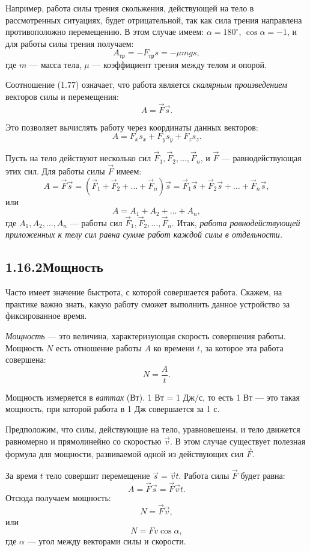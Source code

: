 Например, работа силы трения скольжения, действующей на тело в рассмотренных ситуа\-циях, будет отрицательной, так как сила трения направлена противоположно перемещению. В этом случае имеем: $\alpha=180^{\circ}$, $\cos\alpha=-1$, и для работы силы трения получаем:
\vadjust{\kern-1.007bp}
$$A_{\text{тр}}=-F_{\text{тр}}s=-\mu mgs,$$
\newpage
\noindent где $m$ — масса тела, $\mu$ — коэффициент трения между телом и опорой.

\vspace{5.146bp}
Соотношение (\textcolor{booklink}{1.77}) означает, что работа является \textit{скалярным произведением} векторов силы и перемещения:
$$A=\vec F\vec s.$$

Это позволяет вычислять работу через координаты данных векторов:
$$A=F_xs_x+F_ys_y+F_zs_z.$$

Пусть на тело действуют несколько сил $\vec F_1,\vec F_2,\ldots,\vec F_n$, и $\vec F$ — равнодействующая этих сил. Для работы силы $\vec F$ имеем:
$$A=\vec F\vec s=(\vec F_1+\vec F_2+\ldots+\vec F_n)\vec s=\vec F_1\vec s+\vec F_2\vec s+\ldots+\vec F_n\vec s,$$
\noindent или
$$A=A_1+A_2+\ldots+A_n,$$
\noindent где $A_1,A_2,\ldots,A_n$ — работы сил $\vec F_1,\vec F_2,\ldots,\vec F_n$. Итак, \textit{работа равнодействующей приложенных к телу сил равна сумме работ каждой силы в отдельности.}

\subsection*{1.16.2\quad Мощность}
Часто имеет значение быстрота, с ко\-торой совершается работа. Скажем, на практике важно знать, какую работу сможет выполнить данное устройство за фиксированное время.

\textit{Мощность} — это величина, характеризующая скорость совершения работы. Мощность $N$ есть отношение работы $A$ ко времени $t$, за которое эта работа совершена:
$$N=\frac{A}{t}.$$

Мощность измеряется в \textit{ваттах} (Вт). 1 Вт = 1 Дж/с, то есть 1 Вт — это такая мощность, при ко\-торой работа в 1 Дж совершается за 1 с.

Предположим, что силы, действующие на тело, уравновешены, и тело движется равномерно и прямолинейно со скоростью $\vec v$. В этом случае существует полезная формула для мощности, развиваемой одной из действующих сил $\vec F$.

За время $t$ тело совершит перемещение $\vec s=\vec vt$. Работа силы $\vec F$ будет равна:
$$A=\vec F\vec s=\vec F\vec vt.$$
\noindent Отсюда получаем мощность:
$$N=\vec F\vec v,$$
\noindent или
$$N=Fv\cos\alpha,$$
\noindent где $\alpha$ — угол между векторами силы и скорости.

